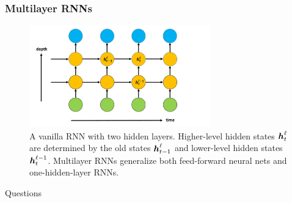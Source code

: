 \documentclass[presentation]{beamer}
\begin{document}
\begin{frame}
    \frametitle{Multilayer RNNs}
    \begin{figure}
        \centering
        \includegraphics[width = 0.7\textwidth]{RNN2}
        \caption{A vanilla RNN with two hidden layers. Higher-level hidden states $\text{\boldmath $h$}_t^{\ell}$ are determined by the old states $\text{\boldmath $h$}_{t-1}^\ell$ and lower-level hidden states $\text{\boldmath $h$}_t^{\ell-1}$. Multilayer RNNs generalize both feed-forward neural nets and one-hidden-layer RNNs.}\label{fig:RNN2}
    \end{figure}

\end{frame}

\begin{frame}[standout]
    Questions
\end{frame}
\end{document}
